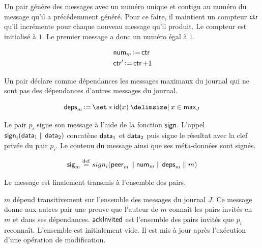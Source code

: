 Un pair génère des messages avec un numéro unique et contigu au numéro du message qu'il a précédemment généré.
Pour ce faire, il maintient un compteur $\operatorname{\mathsf{ctr}}$ qu'il incrémente pour chaque nouveau message qu'il produit.
Le compteur est initialisé à $1$.
Le premier message a donc un numéro égal à $1$.

\begin{align*}
    &\operatorname{\mathsf{num}}_m \operatorname{\vcentcolon=} \operatorname{\mathsf{ctr}}\\
    &\operatorname{\mathsf{ctr}}' \operatorname{\vcentcolon=} \operatorname{\mathsf{ctr}} + 1
\end{align*}

Un pair déclare comme dépendances les messages maximaux du journal qui ne sont pas des dépendances d'autres messages du journal.

\begin{equation*}
    \trm{deps}_m \assign \set*{\trm{id}(x) \given x \in \trm{max}_J}
\end{equation*}

Le pair $p_i$ signe son message à l'aide de la fonction $\operatorname{\mathsf{sign}}$.
L'appel $\operatorname{\mathsf{sign}}_i(\operatorname{\mathsf{data}}_1 \parallel \operatorname{\mathsf{data}}_2)$ concatène $\operatorname{\mathsf{data}}_1$ et $\operatorname{\mathsf{data}}_2$ puis signe le résultat avec la clef privée du pair $p_i$.
Le contenu du message ainsi que ses méta-données sont signés.


\begin{equation*}
    \operatorname{\mathsf{sig}}_m \overset{\mathrm{def}}{=} sign_i(\operatorname{\mathsf{peer}}_m \parallel \operatorname{\mathsf{num}}_m \parallel \operatorname{\mathsf{deps}}_m \parallel m)
\end{equation*}

Le message est finalement transmis à l'ensemble des pairs.

$m$ dépend transitivement sur l'ensemble des messages du journal $J$.
Ce message donne aux autres pair une preuve que l'auteur de $m$ connaît les pairs invités en $m$ et dans ses dépendances.
$\operatorname{\mathsf{ackInvited}}$ est l'ensemble des pairs invités que $p_i$ reconnaît.
L'ensemble est initialement vide.
Il est mis à jour après l'exécution d'une opération de modification.

